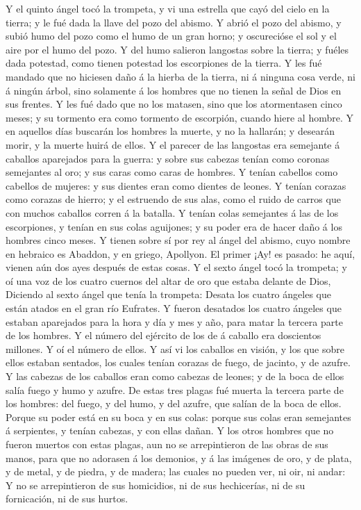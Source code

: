  Y el quinto ángel tocó la trompeta, y vi una estrella que
cayó del cielo en la tierra; y le fué dada la llave del pozo del abismo.
 Y abrió el pozo del abismo, y subió humo del pozo como el
humo de un gran horno; y oscurecióse el sol y el aire por el humo del
pozo.  Y del humo salieron langostas sobre la tierra; y
fuéles dada potestad, como tienen potestad los escorpiones de la tierra.
 Y les fué mandado que no hiciesen daño á la hierba de la
tierra, ni á ninguna cosa verde, ni á ningún árbol, sino solamente á los
hombres que no tienen la señal de Dios en sus frentes.  Y
les fué dado que no los matasen, sino que los atormentasen cinco meses;
y su tormento era como tormento de escorpión, cuando hiere al hombre.
 Y en aquellos días buscarán los hombres la muerte, y no la
hallarán; y desearán morir, y la muerte huirá de ellos.  Y
el parecer de las langostas era semejante á caballos aparejados para la
guerra: y sobre sus cabezas tenían como coronas semejantes al oro; y sus
caras como caras de hombres.  Y tenían cabellos como
cabellos de mujeres: y sus dientes eran como dientes de leones.
 Y tenían corazas como corazas de hierro; y el estruendo de
sus alas, como el ruido de carros que con muchos caballos corren á la
batalla.  Y tenían colas semejantes á las de los
escorpiones, y tenían en sus colas aguijones; y su poder era de hacer
daño á los hombres cinco meses.  Y tienen sobre sí por rey
al ángel del abismo, cuyo nombre en hebraico es Abaddon, y en griego,
Apollyon.  El primer ¡Ay! es pasado: he aquí, vienen aún
dos ayes después de estas cosas.  Y el sexto ángel tocó la
trompeta; y oí una voz de los cuatro cuernos del altar de oro que estaba
delante de Dios,  Diciendo al sexto ángel que tenía la
trompeta: Desata los cuatro ángeles que están atados en el gran río
Eufrates.  Y fueron desatados los cuatro ángeles que
estaban aparejados para la hora y día y mes y año, para matar la tercera
parte de los hombres.  Y el número del ejército de los de á
caballo era doscientos millones. Y oí el número de ellos. 
Y así vi los caballos en visión, y los que sobre ellos estaban sentados,
los cuales tenían corazas de fuego, de jacinto, y de azufre. Y las
cabezas de los caballos eran como cabezas de leones; y de la boca de
ellos salía fuego y humo y azufre.  De estas tres plagas
fué muerta la tercera parte de los hombres: del fuego, y del humo, y del
azufre, que salían de la boca de ellos.  Porque su poder
está en su boca y en sus colas: porque sus colas eran semejantes á
serpientes, y tenían cabezas, y con ellas dañan.  Y los
otros hombres que no fueron muertos con estas plagas, aun no se
arrepintieron de las obras de sus manos, para que no adorasen á los
demonios, y á las imágenes de oro, y de plata, y de metal, y de piedra,
y de madera; las cuales no pueden ver, ni oir, ni andar:  Y
no se arrepintieron de sus homicidios, ni de sus hechicerías, ni de su
fornicación, ni de sus hurtos.


